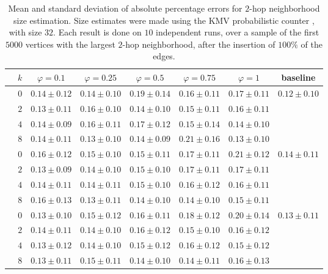 \begin{table*}[ht]
    \centering
    \caption{Mean and standard deviation of absolute percentage errors for $2$-hop neighborhood size estimation. Size estimates were made using the KMV probabilistic counter \cite{trevisan/646978.711822}, with size $32$.
    Each result is done on $10$ independent runs, over a sample of the first $5000$ vertices with the largest $2$-hop neighborhood, after the insertion of $100\%$ of the edges.
    }
    \begin{tabular}{lc|ccccc|c}
    \toprule
        & $k$ & $\varphi = 0.1$ & $\varphi = 0.25$ & $\varphi = 0.5$ & $\varphi = 0.75$ & $\varphi = 1$ & baseline\\
    \midrule

    \parbox[t]{2mm}{}

    & $0$ & $0.14 \pm 0.12$ & $0.14 \pm 0.10$ & $0.19 \pm 0.14$ & $0.16 \pm 0.11$ & $0.17 \pm 0.11$ &  \\
    & $2$ & $0.13 \pm 0.11$ & $0.16 \pm 0.10$ & $0.14 \pm 0.10$ & $0.15 \pm 0.11$ & $0.16 \pm 0.11$ & \\
    & $4$ & $0.14 \pm 0.09$ & $0.16 \pm 0.11$ & $0.17 \pm 0.12$ & $0.15 \pm 0.14$ & $0.14 \pm 0.10$ & \\
    & $8$ & $0.14 \pm 0.11$ & $0.13 \pm 0.10$ & $0.14 \pm 0.09$ & $0.21 \pm 0.16$ & $0.13 \pm 0.10$ & \\

    \midrule[.66pt]
    
    \parbox[t]{2mm}{}

    & $0$ & $0.16 \pm 0.12$ & $0.15 \pm 0.10$ & $0.15 \pm 0.11$ & $0.17 \pm 0.11$ & $0.21 \pm 0.12$ &  \\
    & $2$ & $0.13 \pm 0.09$ & $0.14 \pm 0.10$ & $0.15 \pm 0.10$ & $0.17 \pm 0.11$ & $0.17 \pm 0.11$ & \\
    & $4$ & $0.14 \pm 0.11$ & $0.14 \pm 0.11$ & $0.15 \pm 0.10$ & $0.16 \pm 0.12$ & $0.16 \pm 0.11$ & \\
    & $8$ & $0.16 \pm 0.13$ & $0.13 \pm 0.11$ & $0.14 \pm 0.10$ & $0.14 \pm 0.10$ & $0.15 \pm 0.11$ & \\

    \midrule[.66pt]

    
    \parbox[t]{2mm}{}

    & $0$ & $0.13 \pm 0.10$ & $0.15 \pm 0.12$ & $0.16 \pm 0.11$ & $0.18 \pm 0.12$ & $0.20 \pm 0.14$ &  \\
    & $2$ & $0.14 \pm 0.11$ & $0.14 \pm 0.10$ & $0.16 \pm 0.12$ & $0.15 \pm 0.10$ & $0.16 \pm 0.12$ & \\
    & $4$ & $0.13 \pm 0.12$ & $0.14 \pm 0.10$ & $0.15 \pm 0.12$ & $0.16 \pm 0.12$ & $0.15 \pm 0.12$ & \\
    & $8$ & $0.13 \pm 0.11$ & $0.15 \pm 0.11$ & $0.14 \pm 0.10$ & $0.14 \pm 0.11$ & $0.16 \pm 0.13$ & \\


\end{tabular}
\end{table*}
